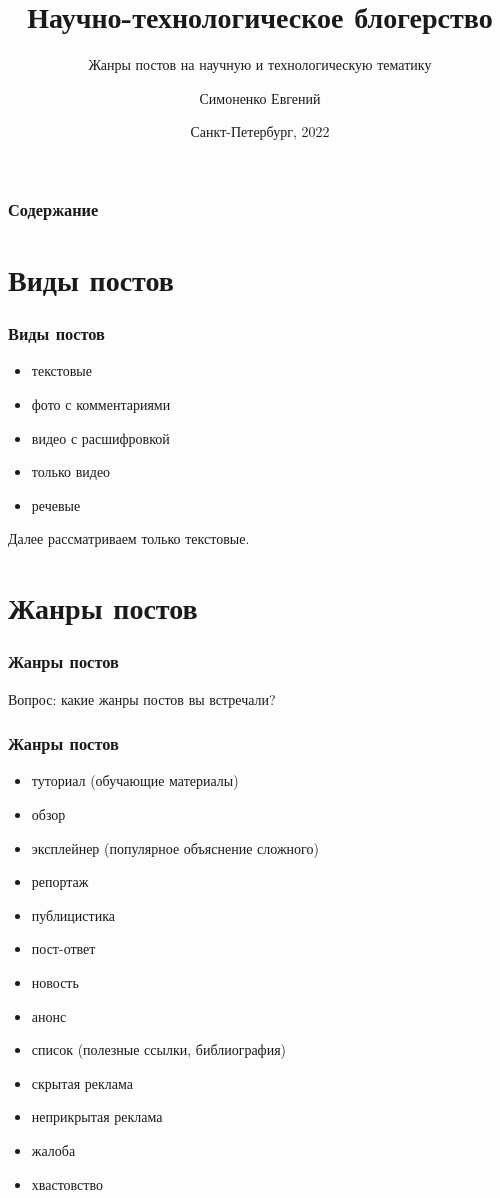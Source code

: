 \documentclass[12pt]{beamer}
\title[Блогерство]{Научно-технологическое блогерство}
\subtitle{Жанры постов на научную и технологическую тематику}
\author[]{Симоненко Евгений}
\institute[]{Университет ИТМО}
\date[]{Санкт-Петербург, 2022}
\begin{document}
\begin{frame}
  \titlepage
\end{frame}

\begin{frame}
  \frametitle{Содержание}
  \tableofcontents
\end{frame}

\section{Виды постов}

\begin{frame}
  \frametitle{Виды постов}
  \begin{itemize}
  \item текстовые
  \item фото с комментариями
  \item видео с расшифровкой
  \item только видео
  \item речевые
  \end{itemize}
  Далее рассматриваем только текстовые.
\end{frame}

\section{Жанры постов}

\begin{frame}
  \frametitle{Жанры постов}
  Вопрос: какие жанры постов вы встречали?
\end{frame}

\begin{frame}
  \frametitle{Жанры постов}
  \begin{itemize}
  \item туториал (обучающие материалы)
  \item обзор
  \item эксплейнер (популярное объяснение сложного)
  \item репортаж
  \item публицистика
  \item пост-ответ
  \item новость
  \item анонс
  \item список (полезные ссылки, библиография)
  \item скрытая реклама
  \item неприкрытая реклама
  \item жалоба
  \item хвастовство
  \end{itemize}
\end{frame}
\end{document}

